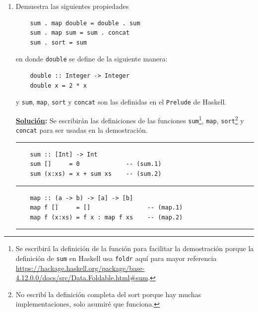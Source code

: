 \documentclass[11pt,letterpaper]{article}
\newcommand{\sol}{\textbf{\underline{Solución}: }} %
\begin{document}
\begin{enumerate}
\item Demuestra las siguientes propiedades

\begin{verbatim}
    sum . map double = double . sum
    sum . map sum = sum . concat
    sum . sort = sum
\end{verbatim}

en donde \texttt{double} se define de la siguiente manera:

\begin{verbatim}
    double :: Integer -> Integer
    double x = 2 * x
\end{verbatim}

y \textcolor{WildStrawberry}{\texttt{sum}}, \textcolor{WildStrawberry}{\texttt{map}},
\textcolor{WildStrawberry}{\texttt{sort}} y \textcolor{WildStrawberry}{\texttt{concat}}
son las definidas en el \texttt{Prelude} de Haskell.

\sol Se escribirán las definiciones de las funciones
\textcolor{WildStrawberry}{\texttt{sum}}\footnote{Se escribirá la definición de la función
para facilitar la demostración porque la definición de \texttt{sum} en Haskell usa \texttt{foldr}
aquí para mayor referencia \url{https://hackage.haskell.org/package/base-4.12.0.0/docs/src/Data.Foldable.html\#sum}. },
\textcolor{WildStrawberry}{\texttt{map}},
\textcolor{WildStrawberry}{\texttt{sort}}\footnote{No escribí la definición completa del sort porque
hay muchas implementaciones, solo asumiré que funciona.}
y \textcolor{WildStrawberry}{\texttt{concat}}
para ser usadas en la demostración.

\noindent
{\color{WildStrawberry} \rule{\linewidth}{0.4mm} }

\begin{verbatim}
    sum :: [Int] -> Int
    sum []     = 0             -- (sum.1)
    sum (x:xs) = x + sum xs    -- (sum.2)  
\end{verbatim}

\noindent
{\color{WildStrawberry} \rule{\linewidth}{0.4mm} }

\begin{verbatim}
    map :: (a -> b) -> [a] -> [b]
    map f []     = []                -- (map.1)
    map f (x:xs) = f x : map f xs    -- (map.2)  
\end{verbatim}

\noindent
{\color{WildStrawberry} \rule{\linewidth}{0.4mm} }


\end{enumerate}
\end{document}
